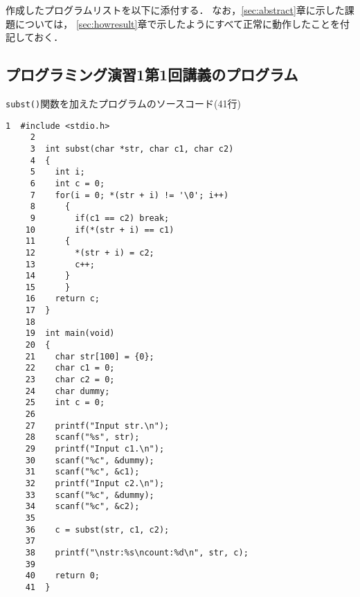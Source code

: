 作成したプログラムリストを以下に添付する．
なお，\ref{sec:abstract}章に示した課題については，
\ref{sec:howresult}章で示したようにすべて正常に動作したことを付記しておく．


\subsection{プログラミング演習1第1回講義のプログラム}\label{func1}
\verb|subst()|関数を加えたプログラムのソースコード(41行)
\begin{Verbatim}[fontsize=\small, baselinestretch=0.8]
     1	#include <stdio.h>
     2	
     3	int subst(char *str, char c1, char c2)
     4	{
     5	  int i;
     6	  int c = 0;
     7	  for(i = 0; *(str + i) != '\0'; i++)
     8	    {
     9	      if(c1 == c2) break;
    10	      if(*(str + i) == c1)
    11		{
    12		  *(str + i) = c2;
    13		  c++;
    14		}
    15	    }
    16	  return c;
    17	}
    18	
    19	int main(void)
    20	{
    21	  char str[100] = {0};
    22	  char c1 = 0;
    23	  char c2 = 0;
    24	  char dummy;
    25	  int c = 0; 
    26	
    27	  printf("Input str.\n");
    28	  scanf("%s", str);
    29	  printf("Input c1.\n");
    30	  scanf("%c", &dummy);
    31	  scanf("%c", &c1);
    32	  printf("Input c2.\n");
    33	  scanf("%c", &dummy);
    34	  scanf("%c", &c2);
    35	
    36	  c = subst(str, c1, c2);
    37	  
    38	  printf("\nstr:%s\ncount:%d\n", str, c);
    39	
    40	  return 0;
    41	}
\end{Verbatim}

